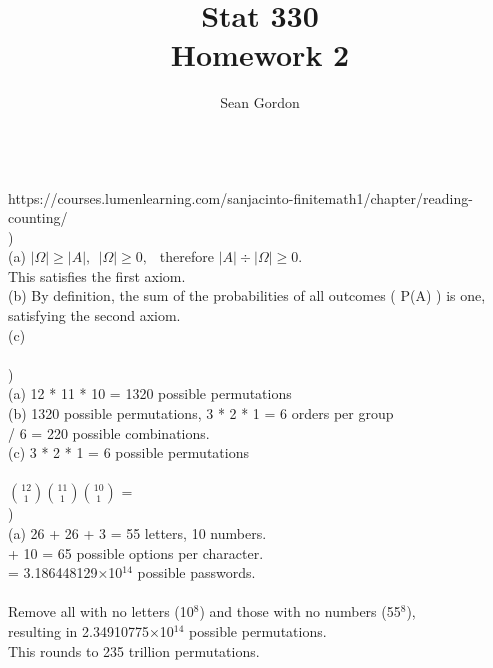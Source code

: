 \documentclass[12pt]{article}
\title{Stat 330\\Homework 2}
\author{Sean Gordon}
\begin{document}
\maketitle


\hrulefill \\

https://courses.lumenlearning.com/sanjacinto-finitemath1/chapter/reading-counting/\\


)\\
\indent (a) $|\Omega| \ge |A|,\ \ |\Omega| \ge 0,\ \ $ therefore $ |A| \div |\Omega| \ge 0$. \\
\indent This satisfies the first axiom.\\

(b) By definition, the sum of the probabilities of all outcomes ( P(A) ) is one, \\
\indent satisfying the second axiom.\\

(c)\\

\hrulefill \\


)\\
\indent (a) 12 * 11 * 10 = 1320 possible permutations\\

\indent (b) 1320 possible permutations, 3 * 2 * 1 = 6 orders per group\\
\indent {} / 6 = 220 possible combinations.\\

\indent (c) 3 * 2 * 1 = 6 possible permutations\\


\hrulefill \\
\pagebreak
{\Large ${12 \choose 1}{11 \choose 1}{10 \choose 1}$} = \\


)\\
\indent (a) 26 + 26 + 3 = 55 letters, 10 numbers.\\
\indent {} + 10 = 65 possible options per character.\\
\indent {} = 3.186448129×10{\large$^{14}$} possible passwords.\\\\
\indent \indent Remove all with no letters (10{\large$^8$}) and those with no numbers (55{\large$^8$}),\\
\indent \indent resulting in 2.34910775×10{\large$^{14}$} possible permutations. \\
\indent \indent This rounds to 235 trillion permutations.
\end{document}
